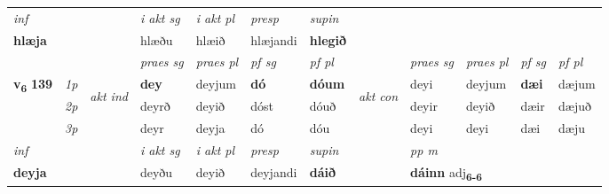 \begin{longtable}[l]{X>{\footnotesize\itshape}llXXXXlXXXX}
   {\textit{inf}} & &  & \textit{i akt sg} & \textit{i akt pl}   & \textit{presp} & \textit{supin}   \\*
  {\textbf{hlæja}} & && hlæðu  & hlæið   & hlæjandi &  \textbf{hlegið}   \\*

\midrule

 & &   & \textit{praes sg}  & \textit{praes pl}    & \textit{ pf sg} & \textit{pf pl} & & \textit{praes sg}  & \textit{praes pl}    & \textit{pf sg} & \textit{pf pl }  \\ \cmidrule{4-7} \cmidrule{9-12}
 \multirow{2}{*}{{{\textbf{v{\textsubscript{6}}} \Large{\textbf{139}}}}}  & 1p & \multirow{3}{*}{\begin{turn}{90}\textit{akt ind}\end{turn}} & \textbf{dey} & deyjum & \textbf{dó} & \textbf{dóum} & \multirow{3}{*}{\begin{turn}{90}\textit{akt con}\end{turn}} &deyi & deyjum & \textbf{dæi} & dæjum\\*
 & 2p &  &  deyrð  & deyið & dóst & dóuð & & deyir & deyið & dæir & dæjuð \\*
 & 3p &  & deyr & deyja & dó & dóu & & deyi & deyi& dæi & dæju \\*
\cmidrule{4-7} \cmidrule{9-12}

   {\textit{inf}} & &  & \textit{i akt sg} & \textit{i akt pl}   & \textit{presp} & \textit{supin}  && \textit{pp m} \\*
  {\textbf{deyja}} & && deyðu  & deyið   & deyjandi &  \textbf{dáið}  && \multicolumn{2}{l}{\textbf{dáinn} adj\textbf{\textsubscript{6-6}}} \\*

\midrule


\end{longtable}
